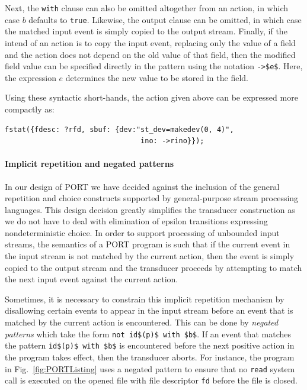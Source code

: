 Next, the \lstinline+with+ clause can also be omitted altogether from an action, in which case $b$ defaults to \lstinline+true+. Likewise, the output clause can be omitted, in which case the matched input event is simply copied to the output stream. Finally, if the intend of an action is to copy the input event, replacing only the value of a field and the action does not depend on the old value of that field, then the modified field value can be specified directly in the pattern using the notation \lstinline+->$e$+. Here, the expression $e$ determines the new value to be stored in the field.

Using these syntactic short-hands, the action given above can be expressed more compactly as:
\begin{lstlisting}[numbers=none,xleftmargin=0em,gobble=2]
  fstat({fdesc: ?rfd, sbuf: {dev:"st_dev=makedev(0, 4)",
                                ino: ->rino}});
\end{lstlisting}


\paragraph*{Implicit repetition and negated patterns}
In our design of PORT we have decided against the inclusion of the general repetition and choice constructs supported by general-purpose stream processing languages. This design decision greatly simplifies the transducer construction as we do not have to deal with elimination of epsilon transitions expressing nondeterministic choice. In order to support processing of unbounded input streams, the semantics of a PORT program is such that if the current event in the input stream is not matched by the current action, then the event is simply copied to the output stream and the transducer proceeds by attempting to match the next input event against the current action.

Sometimes, it is necessary to constrain this implicit repetition mechanism by disallowing certain events to appear in the input stream before an event that is matched by the current action is encountered. This can be done by \emph{negated patterns} which take the form \lstinline+not id$(p)$ with $b$+. If an event that matches the pattern \lstinline+id$(p)$ with $b$+ is encountered before the next positive action in the program takes effect, then the transducer aborts. For instance, the program in Fig.~\ref{fig:PORTListing} uses a negated pattern to ensure that no \lstinline+read+ system call is executed on the opened file with file descriptor \lstinline+fd+ before the file is closed.

